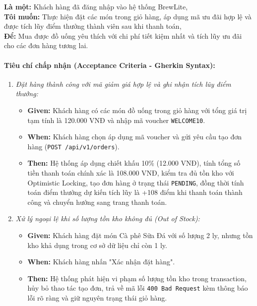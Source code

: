 \documentclass[12pt,a4paper,oneside]{report}
\begin{document}
\begin{tcolorbox}[colback=blue!3,colframe=blue!40,title=\textbf{User Story US-05: Đặt hàng trực tuyến với mã ưu đãi}]
\textbf{Là một:} Khách hàng đã đăng nhập vào hệ thống BrewLite,\\
\textbf{Tôi muốn:} Thực hiện đặt các món trong giỏ hàng, áp dụng mã ưu đãi hợp lệ và được tích lũy điểm thưởng thành viên sau khi thanh toán,\\
\textbf{Để:} Mua được đồ uống yêu thích với chi phí tiết kiệm nhất và tích lũy ưu đãi cho các đơn hàng tương lai.
\end{tcolorbox}

\paragraph{Tiêu chí chấp nhận (Acceptance Criteria - Gherkin Syntax):}
\begin{enumerate}[label=\textbf{Kịch bản \arabic*:}]
    \item \textit{Đặt hàng thành công với mã giảm giá hợp lệ và ghi nhận tích lũy điểm thưởng:}
    \begin{itemize}
        \item \textbf{Given:} Khách hàng có các món đồ uống trong giỏ hàng với tổng giá trị tạm tính là 120.000 VNĐ và nhập mã voucher \texttt{WELCOME10}.
        \item \textbf{When:} Khách hàng chọn áp dụng mã voucher và gửi yêu cầu tạo đơn hàng (\texttt{POST /api/v1/orders}).
        \item \textbf{Then:} Hệ thống áp dụng chiết khấu 10\% (12.000 VNĐ), tính tổng số tiền thanh toán chính xác là 108.000 VNĐ, kiểm tra đủ tồn kho với Optimistic Locking, tạo đơn hàng ở trạng thái \texttt{PENDING}, đồng thời tính toán điểm thưởng dự kiến tích lũy là +108 điểm khi thanh toán thành công và chuyển hướng sang trang thanh toán.
    \end{itemize}
    \item \textit{Xử lý ngoại lệ khi số lượng tồn kho không đủ (Out of Stock):}
    \begin{itemize}
        \item \textbf{Given:} Khách hàng đặt món Cà phê Sữa Đá với số lượng 2 ly, nhưng tồn kho khả dụng trong cơ sở dữ liệu chỉ còn 1 ly.
        \item \textbf{When:} Khách hàng nhấn "Xác nhận đặt hàng".
        \item \textbf{Then:} Hệ thống phát hiện vi phạm số lượng tồn kho trong transaction, hủy bỏ thao tác tạo đơn, trả về mã lỗi \texttt{400 Bad Request} kèm thông báo lỗi rõ ràng và giữ nguyên trạng thái giỏ hàng.
    \end{itemize}
\end{enumerate}
\end{document}
